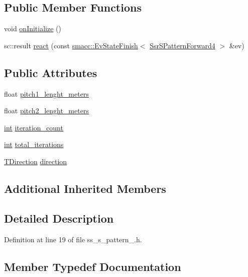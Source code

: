 \subsection*{Public Member Functions}
\begin{DoxyCompactItemize}
\item 
void \hyperlink{structSS5_1_1SsSPattern1_a44155e1057d2829cdbc5e3d83062dfaf}{on\+Initialize} ()
\item 
sc\+::result \hyperlink{structSS5_1_1SsSPattern1_aee8fef3c9b0d35d8b2de3b759ef785ec}{react} (const \hyperlink{structsmacc_1_1EvStateFinish}{smacc\+::\+Ev\+State\+Finish}$<$ \hyperlink{structSsrSPatternForward4}{Ssr\+S\+Pattern\+Forward4} $>$ \&ev)
\end{DoxyCompactItemize}
\subsection*{Public Attributes}
\begin{DoxyCompactItemize}
\item 
float \hyperlink{structSS5_1_1SsSPattern1_aebb7e39c6c0c4ae0632ea88eb2e5857f}{pitch1\+\_\+lenght\+\_\+meters}
\item 
float \hyperlink{structSS5_1_1SsSPattern1_ab0b8056ab43a1a3a4c923ea543e783a2}{pitch2\+\_\+lenght\+\_\+meters}
\item 
\hyperlink{classint}{int} \hyperlink{structSS5_1_1SsSPattern1_ae25d530c02b2ee05d7f83dacc88446cb}{iteration\+\_\+count}
\item 
\hyperlink{classint}{int} \hyperlink{structSS5_1_1SsSPattern1_a76a0ea3cb4b7cc9486114e3d461fcf2b}{total\+\_\+iterations}
\item 
\hyperlink{namespaceSS5_a567f4bfbe784969d523c1fa15e2cf713}{T\+Direction} \hyperlink{structSS5_1_1SsSPattern1_aaf02559c717760bb2711dd53101c833b}{direction}
\end{DoxyCompactItemize}
\subsection*{Additional Inherited Members}


\subsection{Detailed Description}


Definition at line 19 of file ss\+\_\+s\+\_\+pattern\+\_.\+h.



\subsection{Member Typedef Documentation}
